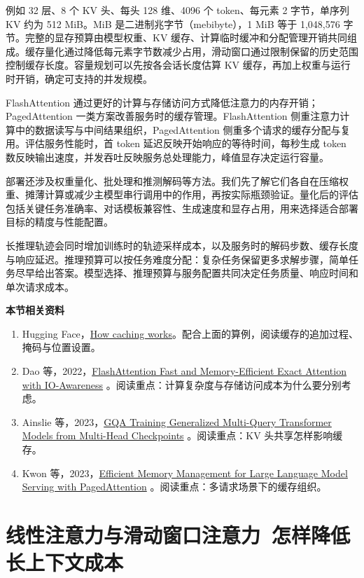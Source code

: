例如 32 层、8 个 KV 头、每头 128 维、4096 个 token、每元素 2 字节，单序列 KV 约为 512 MiB。MiB 是二进制兆字节（mebibyte），1 MiB 等于 1,048,576 字节。完整的显存预算由模型权重、KV 缓存、计算临时缓冲和分配管理开销共同组成。缓存量化通过降低每元素字节数减少占用，滑动窗口通过限制保留的历史范围控制缓存长度。容量规划可以先按各会话长度估算 KV 缓存，再加上权重与运行时开销，确定可支持的并发规模。

FlashAttention 通过更好的计算与存储访问方式降低注意力的内存开销；PagedAttention 一类方案改善服务时的缓存管理。FlashAttention 侧重注意力计算中的数据读写与中间结果组织，PagedAttention 侧重多个请求的缓存分配与复用。评估服务性能时，首 token 延迟反映开始响应的等待时间，每秒生成 token 数反映输出速度，并发吞吐反映服务总处理能力，峰值显存决定运行容量。

部署还涉及权重量化、批处理和推测解码等方法。我们先了解它们各自在压缩权重、摊薄计算或减少主模型串行调用中的作用，再按实际瓶颈验证。量化后的评估包括关键任务准确率、对话模板兼容性、生成速度和显存占用，用来选择适合部署目标的精度与性能配置。

长推理轨迹会同时增加训练时的轨迹采样成本，以及服务时的解码步数、缓存长度与响应延迟。推理预算可以按任务难度分配：复杂任务保留更多求解步骤，简单任务尽早给出答案。模型选择、推理预算与服务配置共同决定任务质量、响应时间和单次请求成本。

\textbf{本节相关资料}
\begin{enumerate}
    \item Hugging Face，\href{https://huggingface.co/docs/transformers/cache_explanation}{How caching works}。配合上面的算例，阅读缓存的追加过程、掩码与位置设置。
    \item Dao 等，2022，\href{https://arxiv.org/abs/2205.14135}{FlashAttention Fast and Memory-Efficient Exact Attention with IO-Awareness} 。阅读重点：计算复杂度与存储访问成本为什么要分别考虑。
    \item Ainslie 等，2023，\href{https://arxiv.org/abs/2305.13245}{GQA Training Generalized Multi-Query Transformer Models from Multi-Head Checkpoints} 。阅读重点：KV 头共享怎样影响缓存。
    \item Kwon 等，2023，\href{https://arxiv.org/abs/2309.06180}{Efficient Memory Management for Large Language Model Serving with PagedAttention} 。阅读重点：多请求场景下的缓存组织。
\end{enumerate}

\section{线性注意力与滑动窗口注意力~怎样降低长上下文成本}\label{线性注意力}

